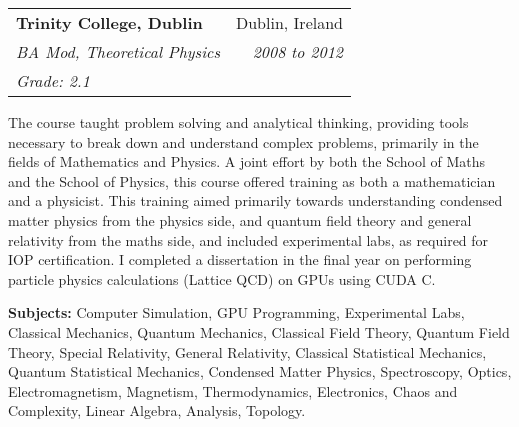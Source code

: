 \documentclass[11pt]{article}
\makeatletter
\newcommand{\resumeSection}[1]{
    \par
    \large {\sc {#1}}
    \par
    \vspace{-0.9\baselineskip}
    \hrulefill
    \vspace{0.5\baselineskip}
    \par
}
\newenvironment{resumeSubSectionHeader}{
    \par
    \begin{tabular*}{\textwidth}{l@{\extracolsep{\fill}}r}
    \par
} {
    \end{tabular*}
    \par
}
\newenvironment{resumeSubSectionBody}{
    \par
    \vspace{-0.8\parskip}
    \begin{small}
    \par
} {
    \par
    \end{small}
    \par
}
\makeatother
\begin{document}
%
%
\begin{resumeSubSectionHeader}

    \textbf{Trinity College, Dublin}   & Dublin, Ireland     \\
    \emph{BA Mod, Theoretical Physics} & \emph{2008 to 2012} \\
    \emph{Grade: 2.1}

\end{resumeSubSectionHeader}
\begin{resumeSubSectionBody}

    The course taught problem solving and analytical thinking, providing
    tools necessary to break down and understand complex problems,
    primarily in the fields of Mathematics and Physics.
    A joint effort by both the School of Maths and the School of Physics,
    this course offered training as both a mathematician and a
    physicist.
    This training aimed primarily towards understanding condensed matter
    physics from the physics side, and quantum field theory and general
    relativity from the maths side, and included experimental labs,
    as required for IOP certification.
    I completed a dissertation in the final year on performing particle
    physics calculations (Lattice QCD) on GPUs using CUDA C.

    \begin{description}
        \item{\bf Subjects:}
            Computer Simulation, GPU Programming,
            Experimental Labs,
            Classical Mechanics, Quantum Mechanics,
            Classical Field Theory, Quantum Field Theory,
            Special Relativity, General Relativity,
            Classical Statistical Mechanics, Quantum Statistical Mechanics,
            Condensed Matter Physics, Spectroscopy,
            Optics, Electromagnetism, Magnetism, Thermodynamics,
            Electronics, Chaos and Complexity,
            Linear Algebra, Analysis,
            Topology.
    \end{description}

\end{resumeSubSectionBody}






\resumeSection{Awards}
\end{document}
